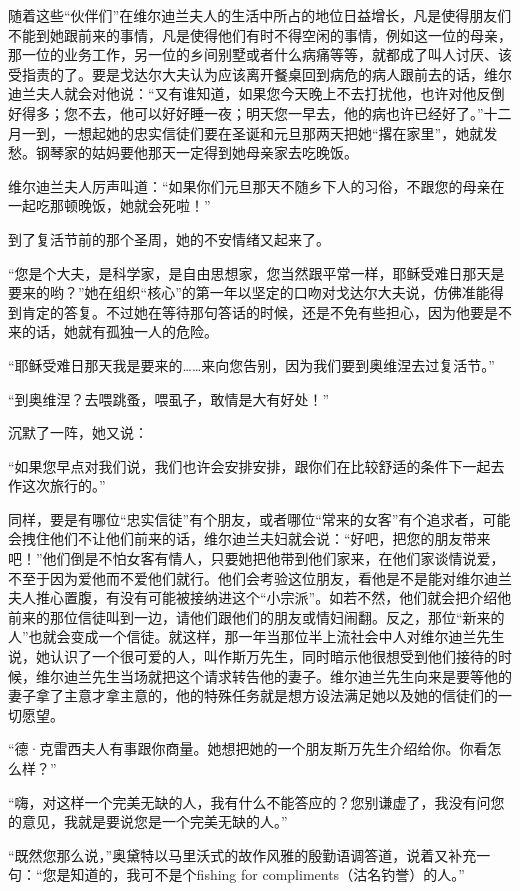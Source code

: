 \par 随着这些“伙伴们”在维尔迪兰夫人的生活中所占的地位日益增长，凡是使得朋友们不能到她跟前来的事情，凡是使得他们有时不得空闲的事情，例如这一位的母亲，那一位的业务工作，另一位的乡间别墅或者什么病痛等等，就都成了叫人讨厌、该受指责的了。要是戈达尔大夫认为应该离开餐桌回到病危的病人跟前去的话，维尔迪兰夫人就会对他说：“又有谁知道，如果您今天晚上不去打扰他，也许对他反倒好得多；您不去，他可以好好睡一夜；明天您一早去，他的病也许已经好了。”十二月一到，一想起她的忠实信徒们要在圣诞和元旦那两天把她“撂在家里”，她就发愁。钢琴家的姑妈要他那天一定得到她母亲家去吃晚饭。
\par 维尔迪兰夫人厉声叫道：“如果你们元旦那天不随乡下人的习俗，不跟您的母亲在一起吃那顿晚饭，她就会死啦！”
\par 到了复活节前的那个圣周，她的不安情绪又起来了。
\par “您是个大夫，是科学家，是自由思想家，您当然跟平常一样，耶稣受难日那天是要来的哟？”她在组织“核心”的第一年以坚定的口吻对戈达尔大夫说，仿佛准能得到肯定的答复。不过她在等待那句答话的时候，还是不免有些担心，因为他要是不来的话，她就有孤独一人的危险。
\par “耶稣受难日那天我是要来的……来向您告别，因为我们要到奥维涅去过复活节。”
\par “到奥维涅？去喂跳蚤，喂虱子，敢情是大有好处！”
\par 沉默了一阵，她又说：
\par “如果您早点对我们说，我们也许会安排安排，跟你们在比较舒适的条件下一起去作这次旅行的。”
\par 同样，要是有哪位“忠实信徒”有个朋友，或者哪位“常来的女客”有个追求者，可能会拽住他们不让他们前来的话，维尔迪兰夫妇就会说：“好吧，把您的朋友带来吧！”他们倒是不怕女客有情人，只要她把他带到他们家来，在他们家谈情说爱，不至于因为爱他而不爱他们就行。他们会考验这位朋友，看他是不是能对维尔迪兰夫人推心置腹，有没有可能被接纳进这个“小宗派”。如若不然，他们就会把介绍他前来的那位信徒叫到一边，请他们跟他们的朋友或情妇闹翻。反之，那位“新来的人”也就会变成一个信徒。就这样，那一年当那位半上流社会中人对维尔迪兰先生说，她认识了一个很可爱的人，叫作斯万先生，同时暗示他很想受到他们接待的时候，维尔迪兰先生当场就把这个请求转告他的妻子。维尔迪兰先生向来是要等他的妻子拿了主意才拿主意的，他的特殊任务就是想方设法满足她以及她的信徒们的一切愿望。
\par “德·克雷西夫人有事跟你商量。她想把她的一个朋友斯万先生介绍给你。你看怎么样？”
\par “嗨，对这样一个完美无缺的人，我有什么不能答应的？您别谦虚了，我没有问您的意见，我就是要说您是一个完美无缺的人。”
\par “既然您那么说，”奥黛特以马里沃式的故作风雅的殷勤语调答道，说着又补充一句：“您是知道的，我可不是个fishing for compliments（沽名钓誉）的人。”
